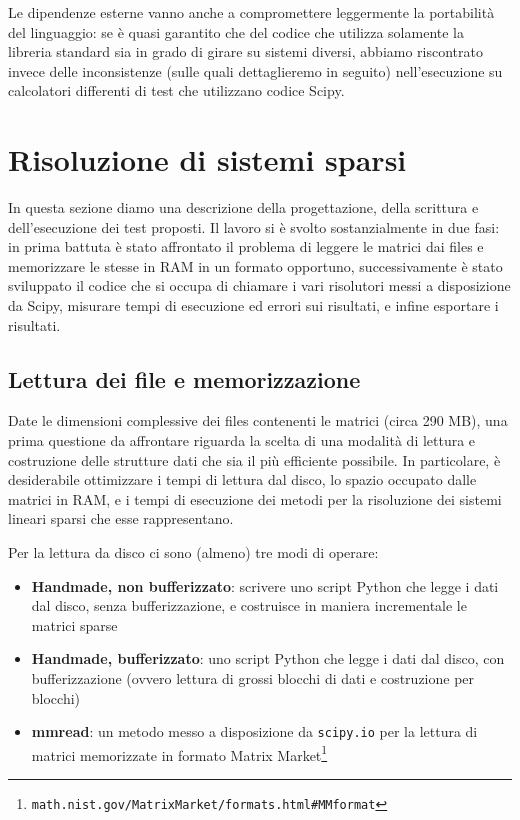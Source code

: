 \documentclass[11pt,a4paper]{scrartcl}
\begin{document}
Le dipendenze esterne vanno anche a compromettere leggermente la portabilità del linguaggio: se è quasi garantito che del codice che utilizza solamente la libreria standard sia in grado di girare su sistemi diversi, abbiamo riscontrato invece delle inconsistenze (sulle quali dettaglieremo in seguito) nell'esecuzione su calcolatori differenti di test che utilizzano codice Scipy. 


\section*{Risoluzione di sistemi sparsi}

In questa sezione diamo una descrizione della progettazione, della scrittura e dell'esecuzione dei test proposti. Il lavoro si è svolto sostanzialmente in due fasi: in prima battuta è stato affrontato il problema di leggere le matrici dai files e memorizzare le stesse in RAM in un formato opportuno, successivamente è stato sviluppato il codice che si occupa di chiamare i vari risolutori messi a disposizione da Scipy, misurare tempi di esecuzione ed errori sui risultati, e infine esportare i risultati.

\subsection*{Lettura dei file e memorizzazione}
Date le dimensioni complessive dei files contenenti le matrici (circa 290 MB), una prima questione da affrontare riguarda la scelta di una modalità di lettura e costruzione delle strutture dati che sia il più efficiente possibile. In particolare, è desiderabile ottimizzare i tempi di lettura dal disco, lo spazio occupato dalle matrici in RAM, e i tempi di esecuzione dei metodi per la risoluzione dei sistemi lineari sparsi che esse rappresentano.

Per la lettura da disco ci sono (almeno) tre modi di operare:
\begin{itemize}
\item \textbf{Handmade, non bufferizzato}: scrivere uno script Python che legge i dati dal disco, senza bufferizzazione, e costruisce in maniera incrementale le matrici sparse
\item \textbf{Handmade, bufferizzato}: uno script Python che legge i dati dal disco, con bufferizzazione (ovvero lettura di grossi blocchi di dati e costruzione per blocchi)
\item \textbf{mmread}: un metodo messo a disposizione da \texttt{scipy.io} per la lettura di matrici memorizzate in formato Matrix Market\footnote{\texttt{math.nist.gov/MatrixMarket/formats.html\#MMformat}}
\end{itemize}
\end{document}
